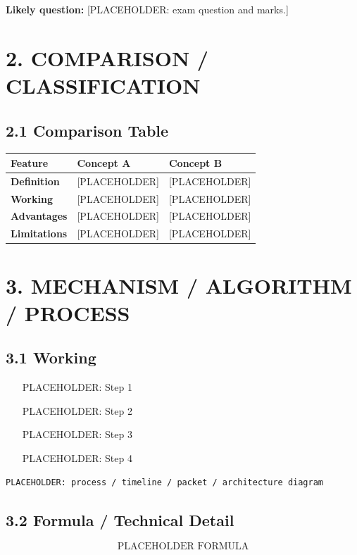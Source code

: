 \documentclass[11pt,a4paper]{article}
\begin{document}
\begin{exambox}
\textbf{Likely question:} [PLACEHOLDER: exam question and marks.]
\end{exambox}

\section{2. COMPARISON / CLASSIFICATION}

\subsection{2.1 Comparison Table}
\begin{center}
\small
\begin{tabularx}{\textwidth}{>{\bfseries}p{} X X}
\toprule
Feature & Concept A & Concept B \\ 
\midrule
Definition & [PLACEHOLDER] & [PLACEHOLDER] \\ 
Working & [PLACEHOLDER] & [PLACEHOLDER] \\ 
Advantages & [PLACEHOLDER] & [PLACEHOLDER] \\ 
Limitations & [PLACEHOLDER] & [PLACEHOLDER] \\ 
\bottomrule
\end{tabularx}
\end{center}

\section{3. MECHANISM / ALGORITHM / PROCESS}

\subsection{3.1 Working}
\begin{enumerate}
    \item [PLACEHOLDER: Step 1]
    \item [PLACEHOLDER: Step 2]
    \item [PLACEHOLDER: Step 3]
    \item [PLACEHOLDER: Step 4]
\end{enumerate}

\begin{center}
\texttt{PLACEHOLDER: process / timeline / packet / architecture diagram}
\end{center}

\subsection{3.2 Formula / Technical Detail}
\[
    \text{PLACEHOLDER FORMULA}
\]
\end{document}
